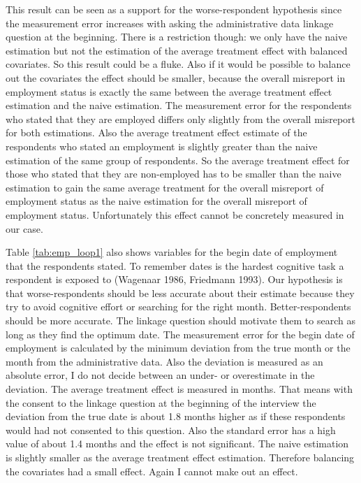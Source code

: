 This result can be seen as a support for the worse-respondent hypothesis since the measurement error increases with asking the administrative data linkage question at the beginning. There is a restriction though: we only have the naive estimation but not the estimation of the average treatment effect with balanced covariates. So this result could be a fluke. Also if it would be possible to balance out the covariates the effect should be smaller, because the overall misreport in employment status is exactly the same between the average treatment effect estimation and the naive estimation. The measurement error for the respondents who stated that they are employed differs only slightly from the overall misreport for both estimations. Also the average treatment effect estimate of the respondents who stated an employment is slightly greater than the naive estimation of the same group of respondents. So the average treatment effect for those who stated that they are non-employed has to be smaller than the naive estimation to gain the same average treatment for the overall misreport of employment status as the naive estimation for the overall misreport of employment status. Unfortunately this effect cannot be concretely measured in our case.

Table  \ref{tab:emp_loop1} also shows variables for the begin date of employment that the respondents stated. To remember dates is the hardest cognitive task a respondent is exposed to (Wagenaar 1986, Friedmann 1993). Our hypothesis is that worse-respondents should be less accurate about their estimate because they try to avoid cognitive effort or searching for the right month. Better-respondents should be more accurate. The linkage question should motivate them to search as long as they find the optimum date. The measurement error for the begin date of employment is calculated by the minimum deviation from the true month or the month from the administrative data. Also the deviation is measured as an absolute error, I do not decide between an under- or overestimate in the deviation. The average treatment effect is measured in months. That means with the consent to the linkage question at the beginning of the interview the deviation from the true date is about 1.8 months higher as if these respondents would had not consented to this question. Also the standard error has a high value of about 1.4 months and the effect is not significant. The naive estimation is slightly smaller as the average treatment effect estimation. Therefore balancing the covariates had a small effect. Again I cannot make out an effect. 

